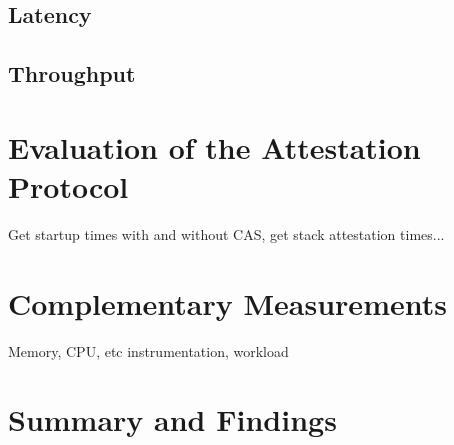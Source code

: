\subsection{Latency}
\label{ssec:testbench_2_latency}

\subsection{Throughput}
\label{ssec:testbench_2_throughput}

\section{Evaluation of the Attestation Protocol}
\label{sec:evaluation_attestation_protocol}

Get startup times with and without CAS, get stack attestation times...

\section{Complementary Measurements}
\label{sec:complementary_measurements}

Memory, CPU, etc instrumentation, workload

\section{ Summary and Findings}
\label{sec:summary_and_findings}
